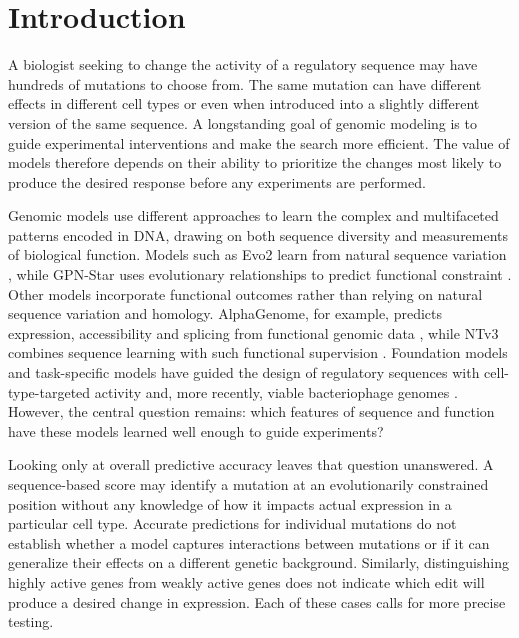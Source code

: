 \section{Introduction}
A biologist seeking to change the activity of a regulatory sequence may have hundreds of mutations to choose from. The same mutation can have different effects in different cell types or even when introduced into a slightly different version of the same sequence. A longstanding goal of genomic modeling is to guide experimental interventions and make the search more efficient. The value of models therefore depends on their ability to prioritize the changes most likely to produce the desired response before any experiments are performed.



Genomic models use different approaches to learn the complex and multifaceted patterns encoded in DNA, drawing on both sequence diversity and measurements of biological function. Models such as Evo2 learn from natural sequence variation \citep{brixi2026evo2}, while GPN-Star uses evolutionary relationships to predict functional constraint \citep{ye2025predicting}. Other models incorporate functional outcomes rather than relying on natural sequence variation and homology. AlphaGenome, for example, predicts expression, accessibility and splicing from functional genomic data \citep{avsec2026alphagenome}, while NTv3 combines sequence learning with such functional supervision \citep{boshar2025ntv3}. Foundation models and task-specific models have guided the design of regulatory sequences with cell-type-targeted activity \citep{gosai2024design} and, more recently, viable bacteriophage genomes \citep{king2026generative}. However, the central question remains: which features of sequence and function have these models learned well enough to guide experiments?

Looking only at overall predictive accuracy leaves that question unanswered. A sequence-based score may identify a mutation at an evolutionarily constrained position without any knowledge of how it impacts actual expression in a particular cell type. Accurate predictions for individual mutations do not establish whether a model captures interactions between mutations or if it can generalize their effects on a different genetic background. Similarly, distinguishing highly active genes from weakly active genes does not indicate which edit will produce a desired change in expression. Each of these cases calls for more precise testing.

